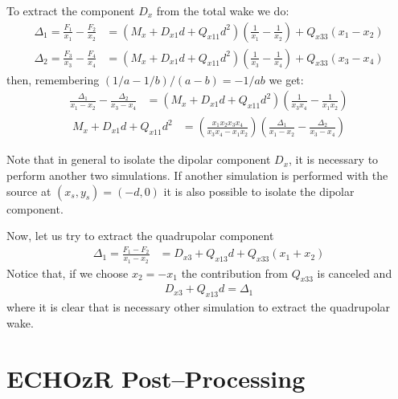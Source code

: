 \begin{apendicesenv}
    To extract the component $D_x$ from the total wake we do:
    \begin{align}
		\Delta_1 = \frac{F_1}{x_1} - \frac{F_2}{x_2} &= \left(M_x  +  D_{x1}d  +  Q_{x11}d^2\right)\left(\frac{1}{x_1}-\frac{1}{x_2}\right) + Q_{x33}(x_1-x_2) \\
		\Delta_2 = \frac{F_3}{x_3} - \frac{F_4}{x_4} &= \left(M_x  +  D_{x1}d  +  Q_{x11}d^2\right)\left(\frac{1}{x_3}-\frac{1}{x_4}\right) + Q_{x33}(x_3-x_4)
    \end{align}
    then, remembering $(1/a-1/b)/(a-b) = -1/ab$ we get:
    \begin{align}
		\frac{\Delta_1}{x_1-x_2} - \frac{\Delta_2}{x_3-x_4} &= \left(M_x  +  D_{x1} d  +  Q_{x11} d^2\right)\left(\frac{1}{x_3x_4} - \frac{1}{x_1x_2}\right)
    \end{align}
    \begin{align}
		M_x  +  D_{x1} d +  Q_{x11} d^2 &= \left(\frac{x_1x_2x_3x_4}{x_3x_4 - x_1x_2}\right)\left(\frac{\Delta_1}{x_1-x_2} - \frac{\Delta_2}{x_3-x_4}\right)
    \end{align}

    Note that in general to isolate the dipolar component $D_x$, it is necessary to perform another two simulations. If another simulation is performed with the source at $(x_s,y_s) = (-d,0)$ it is also possible to isolate the dipolar component.

    Now, let us try to extract the quadrupolar component
    \begin{align}
		\Delta_1 = \frac{F_1 - F_2}{x_1-x_2} &= D_{x3} + Q_{x13}d + Q_{x33}(x_1 + x_2)
    \end{align}
    Notice that, if we choose $x_2=-x_1$ the contribution from $Q_{x33}$ is canceled and
    \begin{align}
		D_{x3} + Q_{x13}d = \Delta_1
    \end{align}
    where it is clear that is necessary other simulation to extract the quadrupolar wake.


\chapter{ECHOzR Post--Processing}\label{app:wake_from_echozr}


\end{apendicesenv}
